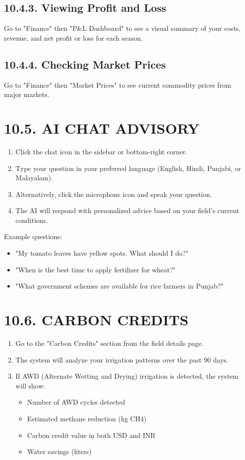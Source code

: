 \documentclass[12pt, a4paper]{report}
\begin{document}
\begin{enumerate}[leftmargin=*]
\subsection{10.4.3. Viewing Profit and Loss}
Go to "Finance" then "P\&L Dashboard" to see a visual summary of your costs, revenue, and net profit or loss for each season.

\subsection{10.4.4. Checking Market Prices}
Go to "Finance" then "Market Prices" to see current commodity prices from major markets.

\section{10.5. AI CHAT ADVISORY}
\begin{enumerate}[leftmargin=*]
  \item Click the chat icon in the sidebar or bottom-right corner.
  \item Type your question in your preferred language (English, Hindi, Punjabi, or Malayalam).
  \item Alternatively, click the microphone icon and speak your question.
  \item The AI will respond with personalized advice based on your field's current conditions.
\end{enumerate}
Example questions:

\begin{itemize}[leftmargin=*]
  \item "My tomato leaves have yellow spots. What should I do?"
  \item "When is the best time to apply fertilizer for wheat?"
  \item "What government schemes are available for rice farmers in Punjab?"
\end{itemize}
\section{10.6. CARBON CREDITS}
\begin{enumerate}[leftmargin=*]
  \item Go to the "Carbon Credits" section from the field details page.
  \item The system will analyze your irrigation patterns over the past 90 days.
  \item If AWD (Alternate Wetting and Drying) irrigation is detected, the system will show:
\begin{itemize}[leftmargin=*]
  \item Number of AWD cycles detected
  \item Estimated methane reduction (kg CH4)
  \item Carbon credit value in both USD and INR
  \item Water savings (liters)
\end{itemize}

\end{enumerate}
\end{enumerate}
\end{document}
